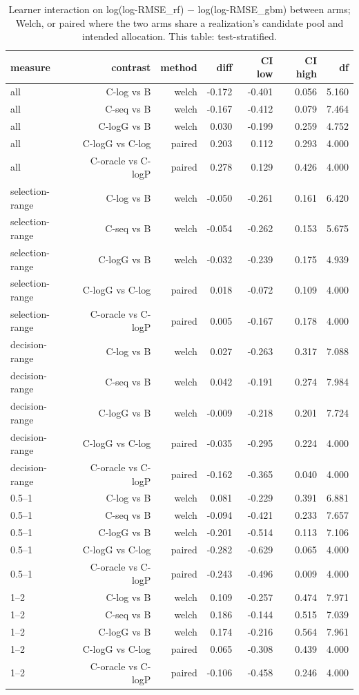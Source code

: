 \begin{table}[htbp]
\centering
\caption{Learner interaction on log(log-RMSE\_rf) − log(log-RMSE\_gbm) between arms; Welch, or paired where the two arms share a realization's candidate pool and intended allocation. This table: test-stratified.}
\label{tab:rep:interactions:test-stratified}
\begin{tabular}{lrrrrrr}
\toprule
measure & contrast & method & diff & CI low & CI high & df \\
\midrule
all & C-log vs B & welch & -0.172 & -0.401 & 0.056 & 5.160 \\
all & C-seq vs B & welch & -0.167 & -0.412 & 0.079 & 7.464 \\
all & C-logG vs B & welch & 0.030 & -0.199 & 0.259 & 4.752 \\
all & C-logG vs C-log & paired & 0.203 & 0.112 & 0.293 & 4.000 \\
all & C-oracle vs C-logP & paired & 0.278 & 0.129 & 0.426 & 4.000 \\
selection-range & C-log vs B & welch & -0.050 & -0.261 & 0.161 & 6.420 \\
selection-range & C-seq vs B & welch & -0.054 & -0.262 & 0.153 & 5.675 \\
selection-range & C-logG vs B & welch & -0.032 & -0.239 & 0.175 & 4.939 \\
selection-range & C-logG vs C-log & paired & 0.018 & -0.072 & 0.109 & 4.000 \\
selection-range & C-oracle vs C-logP & paired & 0.005 & -0.167 & 0.178 & 4.000 \\
decision-range & C-log vs B & welch & 0.027 & -0.263 & 0.317 & 7.088 \\
decision-range & C-seq vs B & welch & 0.042 & -0.191 & 0.274 & 7.984 \\
decision-range & C-logG vs B & welch & -0.009 & -0.218 & 0.201 & 7.724 \\
decision-range & C-logG vs C-log & paired & -0.035 & -0.295 & 0.224 & 4.000 \\
decision-range & C-oracle vs C-logP & paired & -0.162 & -0.365 & 0.040 & 4.000 \\
0.5–1 & C-log vs B & welch & 0.081 & -0.229 & 0.391 & 6.881 \\
0.5–1 & C-seq vs B & welch & -0.094 & -0.421 & 0.233 & 7.657 \\
0.5–1 & C-logG vs B & welch & -0.201 & -0.514 & 0.113 & 7.106 \\
0.5–1 & C-logG vs C-log & paired & -0.282 & -0.629 & 0.065 & 4.000 \\
0.5–1 & C-oracle vs C-logP & paired & -0.243 & -0.496 & 0.009 & 4.000 \\
1–2 & C-log vs B & welch & 0.109 & -0.257 & 0.474 & 7.971 \\
1–2 & C-seq vs B & welch & 0.186 & -0.144 & 0.515 & 7.039 \\
1–2 & C-logG vs B & welch & 0.174 & -0.216 & 0.564 & 7.961 \\
1–2 & C-logG vs C-log & paired & 0.065 & -0.308 & 0.439 & 4.000 \\
1–2 & C-oracle vs C-logP & paired & -0.106 & -0.458 & 0.246 & 4.000 \\
\bottomrule
\end{tabular}
\end{table}
